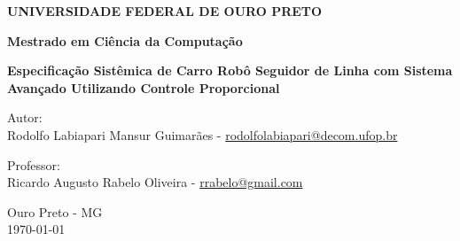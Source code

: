 \documentclass[portugues, brazil, a4paper,12pt]{article}
\begin{document}
\begin{titlepage}
  \vfill

  \begin{center}
    \begin{Large}
      \textbf{UNIVERSIDADE FEDERAL DE OURO PRETO}
    \end{Large}
  \end{center}

  \begin{center}
    \begin{large}
      \textbf{Mestrado em Ciência da Computação} \\[1.4cm]
    \end{large}
  \end{center}

  \vfill

  \begin{center}
    \begin{large}
      \textbf{Especificação Sistêmica de Carro Robô Seguidor de Linha com Sistema Avançado Utilizando Controle Proporcional}
    \end{large}
  \end{center}

  \vfill

  \begin{center}
    \begin{large}
      Autor: \\
		Rodolfo Labiapari Mansur Guimarães - \url{rodolfolabiapari@decom.ufop.br}
    \end{large}
  \end{center}

	\vfill

  \begin{center}
    \begin{large}
      Professor: \\
      Ricardo Augusto Rabelo Oliveira - \url{rrabelo@gmail.com}
    \end{large}
  \end{center}

  \vfill

  \begin{center}
    \begin{large}
      Ouro Preto - MG \\
      \today \\
    \end{large}
  \end{center}

\clearpage
\tableofcontents
\end{titlepage}
\end{document}
